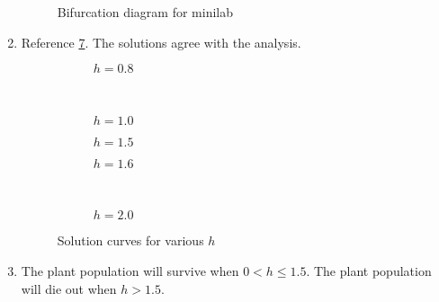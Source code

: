 \documentclass[12pt]{article}
\begin{document}
\begin{enumerate}
\begin{figure}
  \caption{Bifurcation diagram for minilab}
  \label{fig:minilab-bifurcation-diagram}
  \end{figure}
\item Reference \cref{fig:minilab-solution-curves}. The solutions agree with the
  analysis.

  \begin{figure}
    \centering
    \begin{subfigure}{0.45\textwidth}
      \hspace{-4em}
      \scalebox{0.45}{}
      \label{fig:minilab-scenario-one}
      \vspace{-28.5em}
      \caption{$h=0.8$}
    \end{subfigure}~
    \begin{subfigure}{0.45\textwidth}
      \hspace{-4em}
      \scalebox{0.45}{}
      \label{fig:minilab-scenario-one}
      \vspace{-28.5em}
      \caption{$h=1.0$}
    \end{subfigure}
    \begin{subfigure}{0.45\textwidth}
      \hspace{-4em}
      \scalebox{0.45}{}
      \label{fig:minilab-scenario-one}
      \vspace{-28.5em}
      \caption{$h=1.5$}
    \end{subfigure}
    \begin{subfigure}{0.45\textwidth}
      \hspace{-4em}
      \scalebox{0.45}{}
      \label{fig:minilab-scenario-one}
      \vspace{-28.5em}
      \caption{$h=1.6$}
    \end{subfigure}~
    \begin{subfigure}{0.45\textwidth}
      \hspace{-4em}
      \scalebox{0.45}{}
      \label{fig:minilab-scenario-one}
      \vspace{-28.5em}
      \caption{$h=2.0$}
    \end{subfigure}
    \caption{Solution curves for various $h$}
    \label{fig:minilab-solution-curves}
  \end{figure}
\item The plant population will survive when $0<h\le1.5$. The plant population
  will die out when $h>1.5$.
\end{enumerate}
\end{document}
